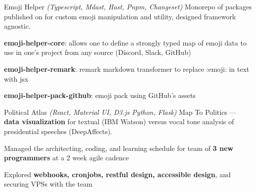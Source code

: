 

\begin{cventries}


\cventryproject
    {Emoji Helper} %
    {\emph{(Typescript, Mdast, Hast, Pnpm, Changeset)}}
    {} %
    {Monorepo of packages published on  for custom emoji manipulation and utility, designed framework agnostic.} %
    {
      \begin{cvitems} %
        \item {\textbf{emoji-helper-core}: allows one to define a strongly typed map of emoji data to use in one's project from any source (Discord, Slack, GitHub)}
        \item {\textbf{emoji-helper-remark}: remark markdown transformer to replace :emoji: in text with jsx}
        \item {\textbf{emoji-helper-pack-github}: emoji pack using GitHub's assets}
      \end{cvitems}
    }

\cventryproject
    {Political Atlas} %
    {\emph{(React, Material UI, D3.js Python, Flask)}}
    {} %
    {Map To Politics --- \textbf{data visualization} for textual (IBM Watson) versus vocal tone analysis of presidential speeches (DeepAffects).} %
    {
      \begin{cvitems} %
        \item {Managed the architecting, coding, and learning schedule for team of \textbf{3 new programmers} at a 2 week agile cadence}
        \item {Explored \textbf{webhooks, cronjobs, restful design, accessible design}, and securing VPSs with the team}
      \end{cvitems}
    }

\end{cventries}
